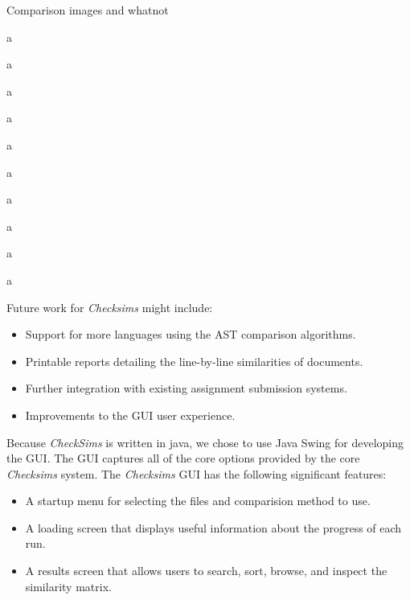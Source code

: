 \documentclass[landscape,a0paper,fontscale=0.285]{baposter}
\begin{document}
\begin{poster}


 {
    Comparison images and whatnot

    a

    a

    a

    a

    a

    a

    a

    a

    a

    a
}

 {

  Future work for \textit{Checksims} might include:
  \begin{itemize}
  \item Support for more languages using the AST comparison algorithms.
  \item Printable reports detailing the line-by-line similarities of documents.
  \item Further integration with existing assignment submission systems.
  \item Improvements to the GUI user experience.
  \end{itemize}
}

 {
    Because \textit{CheckSims} is written in java, we chose to use Java Swing for
    developing the GUI. The GUI captures all of the core options provided by the
    core \textit{Checksims} system.
    The \textit{Checksims} GUI has the following significant features:
    \begin{itemize}
    \item A startup menu for selecting the files and comparision method to use.
    \item A loading screen that displays useful information about the progress of
      each run.
    \item A results screen that allows users to search, sort, browse, and inspect
      the similarity matrix.
    \end{itemize}
  
}
\end{poster}
\end{document}
